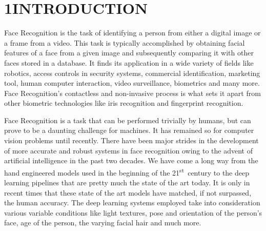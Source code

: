 \documentclass[12pt]{article}
\renewcommand{\headrulewidth}{0pt}
\renewcommand{\_}{\kern-1.5pt\textunderscore\kern-1.5pt}
\begin{document}
\setlength{\parskip}{6.0pt}

 \par


\tableofcontents
\newpage
\listoffigures
\listoftables
\newpage
\setlength\arrayrulewidth{0.4pt}
\renewcommand{\headrulewidth}{0.4pt}
\vspace{\baselineskip}

\vspace{\baselineskip}

\frontmatter
{}
\rhead{\thepage}
\linespread{1.25}

\section*{1\hspace*{10pt}INTRODUCTION}
\begin{justify}
Face Recognition is the task of identifying a person from either a digital image or a frame from a video. This task is typically accomplished by obtaining facial features of a face from a given image and subsequently comparing it with other faces stored in a database. It finds its application in a wide variety of fields like robotics, access controls in security systems, commercial identification, marketing tool, human computer interaction, video surveillance, biometrics and many more. Face Recognition’s contactless and non-invasive process is what sets it apart from other biometric technologies like iris recognition and fingerprint recognition.
\end{justify}\par

\begin{justify}
Face Recognition is a task that can be performed trivially by humans, but can prove to be a daunting challenge for machines. It has remained so for computer vision problems until recently. There have been major strides in the development of more accurate and robust systems in face recognition owing to the advent of artificial intelligence in the past two decades. We have come a long way from the hand engineered models used in the beginning of the 21\textsuperscript{st}\ century to the deep learning pipelines that are pretty much the state of the art today. It is only in recent times that these state of the art models have matched, if not surpassed, the human accuracy. The deep learning systems employed take into consideration various variable conditions like light textures, pose and orientation of  the person’s face, age of the person, the varying facial hair and much more.
\end{justify}\par
\end{document}
